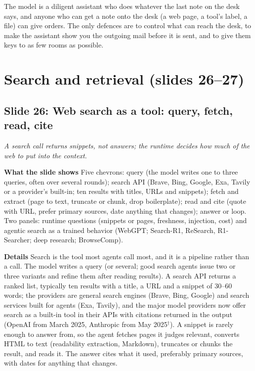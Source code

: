 \documentclass[11pt,letterpaper]{article}
\newcommand{\setstage}[1]{\colorlet{stagec}{#1}}
\newcommand{\slide}[3]{%
  \subsection[Slide #1: #2]{Slide #1: #2}%
  {\color{muted}\itshape #3\par}\medskip}
\newcommand{\para}[1]{\medskip\noindent\textbf{#1}\quad}
\newenvironment{intuition}{\begin{tcolorbox}[intuitionbox]}{\end{tcolorbox}}
\begin{document}
\begin{intuition}
The model is a diligent assistant who does whatever the last note on the desk says, and anyone who can get a note onto the desk (a web page, a tool's label, a file) can give orders. The only defences are to control what can reach the desk, to make the assistant show you the outgoing mail before it is sent, and to give them keys to as few rooms as possible.
\end{intuition}
\clearpage
\setstage{vc}
\section{Search and retrieval (slides 26--27)}

\slide{26}{Web search as a tool: query, fetch, read, cite}{A search call returns snippets, not answers; the runtime decides how much of the web to put into the context.}

\para{What the slide shows} Five chevrons: query (the model writes one to three queries, often over several rounds); search API (Brave, Bing, Google, Exa, Tavily or a provider's built-in; ten results with titles, URLs and snippets); fetch and extract (page to text, truncate or chunk, drop boilerplate); read and cite (quote with URL, prefer primary sources, date anything that changes); answer or loop. Two panels: runtime questions (snippets or pages, freshness, injection, cost) and agentic search as a trained behavior (WebGPT; Search-R1, ReSearch, R1-Searcher; deep research; BrowseComp).

\para{Details} Search is the tool most agents call most, and it is a pipeline rather than a call. The model writes a query (or several; good search agents issue two or three variants and refine them after reading results). A search API returns a ranked list, typically ten results with a title, a URL and a snippet of 30--60 words; the providers are general search engines (Brave, Bing, Google) and search services built for agents (Exa, Tavily), and the major model providers now offer search as a built-in tool in their APIs with citations returned in the output (OpenAI from March 2025, Anthropic from May 2025$^\dagger$). A snippet is rarely enough to answer from, so the agent fetches pages it judges relevant, converts HTML to text (readability extraction, Markdown), truncates or chunks the result, and reads it. The answer cites what it used, preferably primary sources, with dates for anything that changes.
\end{document}
